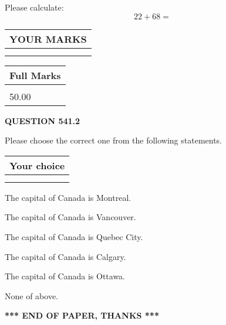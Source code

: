\documentclass[12pt]{article}
\begin{document}
  
 
Please calculate:
\begin{equation}
22 +  %
68 = \nonumber
\end{equation}
 

 

 
  
\vspace{0.2in}
  
\noindent\begin{tabular}{|l|}
\hline
 YOUR MARKS  \\
\hline
 \\ 
 \\ 
\hline
\end{tabular}
\hspace{0.05in} \begin{tabular}{|l|}
\hline
 Full Marks  \\
\hline
 \\ 
50.00 \\
\hline
\end{tabular}
{\textbf{\Large{QUESTION
541.2 
}}}
  
  
Please choose the correct one from the following statements.
  
  
\noindent\hspace{3.0in} \begin{tabular}{|l|}
\hline
Your choice \\
\hline
 \\ 
 \\ 
\hline
\end{tabular}
  
  
 
 
The capital of Canada is Montreal.
 
 
The capital of Canada is Vancouver.
 
 
The capital of Canada is Quebec City.
 
 
The capital of Canada is Calgary.
 
 
The capital of Canada is Ottawa.
 
 
 None of above.
 
 
   
   
 \vspace{0.2in}
 
   
   
   
   
\vspace{1.0in} 
{\textbf{\large{ *** END OF PAPER, THANKS *** }}} 
   
\end{document}
